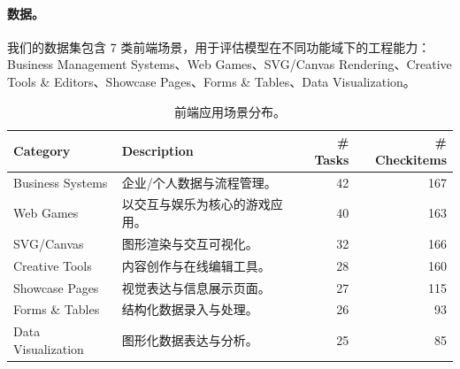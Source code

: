 \paragraph{数据。}
我们的数据集包含 7 类前端场景，用于评估模型在不同功能域下的工程能力：Business Management Systems、Web Games、SVG/Canvas Rendering、Creative Tools \& Editors、Showcase Pages、Forms \& Tables、Data Visualization。


\begin{table}[h]
\centering
\small
\caption{前端应用场景分布。}
\begin{tabular}{lp{7cm}rr}
\toprule
\textbf{Category} & \textbf{Description} & \textbf{\# Tasks} & \textbf{\# Checkitems} \\
\midrule
Business Systems & 企业/个人数据与流程管理。 & 42 & 167 \\
Web Games & 以交互与娱乐为核心的游戏应用。 & 40 & 163\\
SVG/Canvas & 图形渲染与交互可视化。 & 32 & 166\\
Creative Tools & 内容创作与在线编辑工具。 & 28 & 160\\
Showcase Pages & 视觉表达与信息展示页面。 & 27 & 115\\
Forms \& Tables & 结构化数据录入与处理。 & 26 & 93\\
Data Visualization & 图形化数据表达与分析。 & 25 & 85\\
\bottomrule
\end{tabular}

\end{table}

